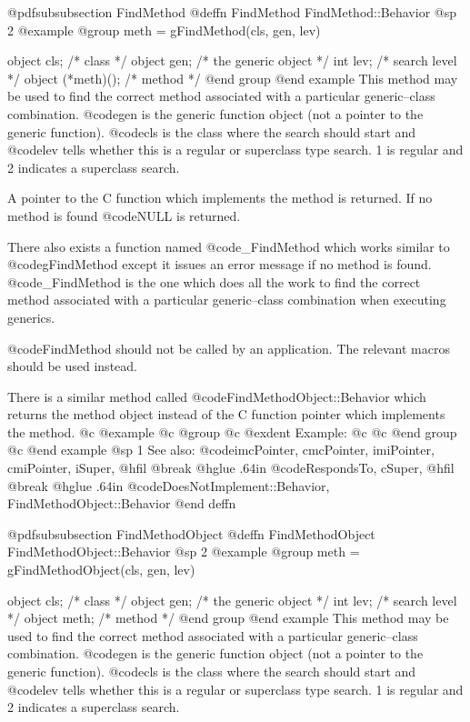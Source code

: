 @pdfsubsubsection {FindMethod}
@deffn {FindMethod} FindMethod::Behavior
@sp 2
@example
@group
meth = gFindMethod(cls, gen, lev)

object  cls;    /* class                */
object  gen;    /* the generic object   */
int     lev;    /* search level         */
object  (*meth)();  /*  method          */
@end group
@end example
This method may be used to find the correct method associated with a
particular generic--class combination.  @code{gen} is the generic
function object (not a pointer to the generic function).  @code{cls} is
the class where the search should start and @code{lev} tells whether
this is a regular or superclass type search.  1 is regular and 2
indicates a superclass search.

A pointer to the C function which implements the method is returned.  If no
method is found @code{NULL} is returned.

There also exists a function named @code{_FindMethod} which works
similar to @code{gFindMethod} except it issues an error message if no
method is found.  @code{_FindMethod} is the one which does all the work
to find the correct method associated with a particular generic--class
combination when executing generics.

@code{FindMethod} should not be called by an application.  The relevant
macros should be used instead.

There is a similar method called @code{FindMethodObject::Behavior} which
returns the method object instead of the C function pointer which
implements the method.
@c @example
@c @group
@c @exdent Example:
@c 
@c @end group
@c @end example
@sp 1
See also:  @code{imcPointer, cmcPointer, imiPointer, cmiPointer, iSuper,}
@hfil @break @hglue .64in    @code{RespondsTo, cSuper,}
@hfil @break @hglue .64in    @code{DoesNotImplement::Behavior, FindMethodObject::Behavior}
@end deffn















@pdfsubsubsection {FindMethodObject}
@deffn {FindMethodObject} FindMethodObject::Behavior
@sp 2
@example
@group
meth = gFindMethodObject(cls, gen, lev)

object  cls;    /* class                */
object  gen;    /* the generic object   */
int     lev;    /* search level         */
object  meth;   /*  method          */
@end group
@end example
This method may be used to find the correct
method associated with a particular generic--class combination.
@code{gen} is the generic function object (not a pointer to the generic
function).  @code{cls} is the class where the search should start and
@code{lev} tells whether this is a regular or superclass type search.
1 is regular and 2 indicates a superclass search.

